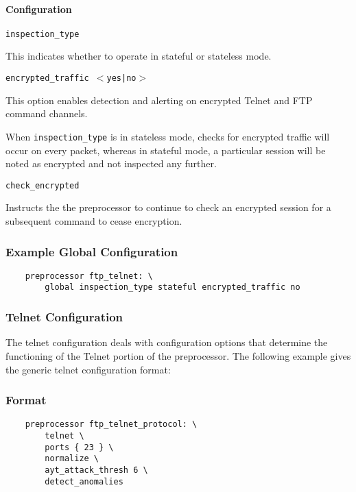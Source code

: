 \documentclass[english]{report}
\newcounter{slistnum}
\newenvironment{slist}
{ \begin{list}{ {\bf \arabic{slistnum}.} }{\usecounter{slistnum} } }
{ \end{list} }
\newenvironment{note}{
\samepage
    \vspace{10pt}{\textsf{
        {\hspace{7pt}\Huge{$\triangle$\hspace{-12.5pt}{\Large{$^!$}}}}\hspace{5pt}
        {\Large{NOTE}}
    }
    }
   \begin{center}
    \par\vspace{-17pt}

    \begin{lrbox}{\savepar}
    \begin{minipage}[r]{6in}
}
{
    \end{minipage}
    \end{lrbox}
    \fbox{
        \usebox{
            \savepar
	}
    }
    \par\vskip10pt
    \end{center}
}
\newenvironment{note}{
        \begin{rawhtml}
        <p><table border="1"><tr><td><b>
        Note:&nbsp;&nbsp;</b>
        \end{rawhtml}
}{
        \begin{rawhtml}
        </b></td></tr></table></p>
        \end{rawhtml}
}
\begin{document}
\paragraph{Configuration}
\begin{slist}
\item \texttt{inspection\_type}

This indicates whether to operate in stateful or stateless mode.

\item \texttt{encrypted\_traffic $<$yes|no$>$}

This option enables detection and alerting on encrypted Telnet and FTP command
channels.

\begin{note}

When \texttt{inspection\_type} is in stateless mode, checks for encrypted
traffic will occur on every packet, whereas in stateful mode, a particular
session will be noted as encrypted and not inspected any further.

\end{note}

\item \texttt{check\_encrypted}

Instructs the the preprocessor to continue to check an encrypted session for a
subsequent command to cease encryption.

\end{slist}

\subsubsection{Example Global Configuration}

\begin{verbatim}
    preprocessor ftp_telnet: \
        global inspection_type stateful encrypted_traffic no
\end{verbatim}

\subsubsection{Telnet Configuration}

The telnet configuration deals with configuration options that determine the
functioning of the Telnet portion of the preprocessor.  The following example
gives the generic telnet configuration format:

\subsubsection{Format}
\begin{verbatim}
    preprocessor ftp_telnet_protocol: \
        telnet \
        ports { 23 } \
        normalize \
        ayt_attack_thresh 6 \
        detect_anomalies

\end{verbatim}
\end{document}
